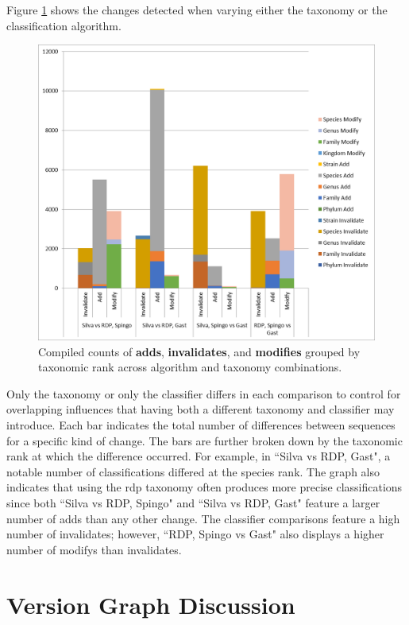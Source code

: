 Figure \ref{mbvl_chart} shows the changes detected when varying either the taxonomy or the classification algorithm.
\begin{figure}
	\centering
	\includegraphics[scale=0.75]{figures/mbvl_chart.png}
	\caption{Compiled counts of \textbf{adds}, \textbf{invalidates}, and \textbf{modifies} grouped by taxonomic rank across algorithm and taxonomy combinations.}
	\label{mbvl_chart}
\end{figure}
Only the taxonomy or only the classifier differs in each comparison to control for overlapping influences that having both a different taxonomy and classifier may introduce.
Each bar indicates the total number of differences between sequences for a specific kind of \gls{change}.
The bars are further broken down by the taxonomic rank at which the difference occurred.
For example, in ``Silva vs RDP, Gast", a notable number of classifications differed at the species rank.
The graph also indicates that using the \gls{rdp} taxonomy often produces more precise classifications since both ``Silva vs RDP, Spingo" and ``Silva vs RDP, Gast" feature a larger number of \glspl{add} than any other change.
The classifier comparisons feature a high number of \glspl{invalidate}; however, ``RDP, Spingo vs Gast" also displays a higher number of \glspl{modify} than \glspl{invalidate}.

\section{Version Graph Discussion}

